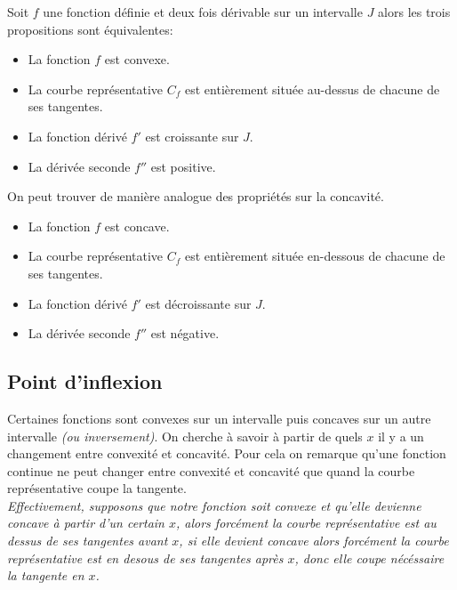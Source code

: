 \documentclass[french]{book}
\begin{document}
\begin{prop}
Soit $f$ une fonction définie et deux fois dérivable sur un intervalle $J$ alors les trois propositions sont équivalentes: 

\begin{itemize}
\item[$\bullet$] La fonction $f$ est convexe.
\item[$\bullet$]  La courbe représentative $C_f$ est entièrement située au-dessus de chacune de ses tangentes.
\item[$\bullet$]  La fonction dérivé $f'$ est croissante sur $J$.
\item[$\bullet$] La dérivée seconde $f''$ est positive.
\end{itemize}

On peut trouver de manière analogue des propriétés sur la concavité.

\begin{itemize}
\item[$\bullet$] La fonction $f$ est concave.
\item[$\bullet$]  La courbe représentative $C_f$ est entièrement située en-dessous de chacune de ses tangentes.
\item[$\bullet$]  La fonction dérivé $f'$ est décroissante sur $J$.
\item[$\bullet$] La dérivée seconde $f''$ est négative.
\end{itemize}

\end{prop}

\subsection{Point d'inflexion}

Certaines fonctions sont convexes sur un intervalle puis concaves sur un autre intervalle \emph{(ou inversement)}. On cherche à savoir à partir de quels $x$ il y a un changement entre convexité et concavité. Pour cela on remarque qu'une fonction continue ne peut changer entre convexité et concavité que quand la courbe représentative coupe la tangente. \\

\emph{Effectivement, supposons que notre fonction soit convexe et qu'elle devienne concave à partir d'un certain $x$, alors forcément la courbe représentative est au dessus de ses tangentes avant $x$, si elle devient concave alors forcément la courbe représentative est en desous de ses tangentes  après $x$, donc elle coupe nécéssaire la tangente en $x$.}
\end{document}
